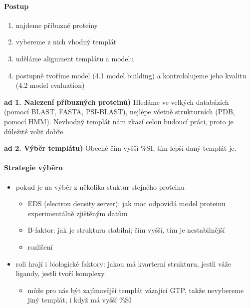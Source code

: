 \documentclass[DIV=8]{scrreprt}
\begin{document}
\paragraph{Postup}
\begin{enumerate}[nosep]
    \item najdeme příbuzné proteiny
    \item vybereme z nich vhodný templát
    \item uděláme alignment templátu a modelu
    \item postupně tvoříme model (4.1 model building) a kontrololujeme jeho kvalitu (4.2 model evaluation)
\end{enumerate}



\textbf{ad 1. Nalezení příbuzných proteinů)} Hledáme ve velkých databázích (pomocí BLAST, FASTA, PSI-BLAST), nejlépe včetně strukturních (PDB, pomocí HMM). Nevhodný templát nám zkazí celou budoucí práci, proto je důležité volit dobře.

\textbf{ad 2. Výběr templátu)} Obecně čím vyšší \%SI, tím lepší daný templát je.

\paragraph{Strategie výběru}
\begin{itemize}[nosep]
    \item pokud je na výběr z několika stuktur stejného proteinu
\begin{itemize}[nosep]
    \item EDS (electron density server): jak moc odpovídá model proteinu experimentálně zjištěným datům
    \item B-faktor: jak je struktura stabilní; čím vyšší, tím je nestabilnější
    \item rozlišení
\end{itemize}

    \item roli hrají i biologické faktory: jakou má kvarterní strukturu, jestli váže ligandy, jestli tvoří komplexy
\begin{itemize}[nosep]
    \item může pro nás být zajímavější templát vázající GTP, takže nevybereme jiný templát, i když má vyšší \%SI
\end{itemize}

\end{itemize}
\end{document}
